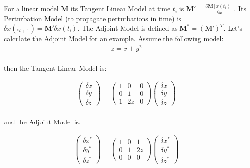 \documentclass{article}
\begin{document}
For a linear model $\mathbf{M}$ its Tangent Linear Model \cite{Benedetti2014} at time $t_i$ is $\mathbf{M}' = \frac{\partial \mathbf{M} [x(t_i)]}{\partial x}$. Its Perturbation Model (to propagate perturbations in time) is $\delta x(t_{i + 1}) = \mathbf{M}' \delta x(t_i)$. The Adjoint Model is defined as $\mathbf{M}^* = (\mathbf{M}')^T$. Let's calculate the Adjoint Model for an example. Assume the following model: \\

\begin{gather*}
z = x + y^2 \\
\end{gather*}

then the Tangent Linear Model is:

\begin{gather*}
\begin{pmatrix}
\delta x \\
\delta y \\
\delta z
\end{pmatrix}
=
\begin{pmatrix}
1 & 0 & 0 \\
0 & 1 & 0 \\
1 & 2z & 0
\end{pmatrix}
\begin{pmatrix}
\delta x \\
\delta y \\
\delta z
\end{pmatrix} \\
\end{gather*}

and the Adjoint Model is:

\begin{gather*}
\begin{pmatrix}
\delta x^* \\
\delta y^* \\
\delta z^*
\end{pmatrix}
=
\begin{pmatrix}
1 & 0 & 1 \\
0 & 1 & 2z \\
0 & 0 & 0
\end{pmatrix}
\begin{pmatrix}
\delta x^* \\
\delta y^* \\
\delta z^*
\end{pmatrix} \\
\end{gather*}
\end{document}
